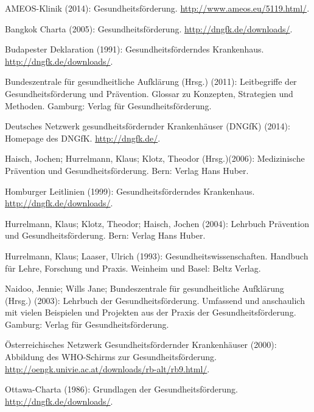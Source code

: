 \begin{thebibliography}{99}

	AMEOS-Klinik (2014): Gesundheitsförderung. \url{http://www.ameos.eu/5119.html/}.

	Bangkok Charta (2005): Gesundheitsförderung. \url{http://dngfk.de/downloads/}.
	
	Budapester Deklaration (1991): Gesundheitsförderndes Krankenhaus. \url{http://dngfk.de/downloads/}.
	
	Bundeszentrale für gesundheitliche Aufklärung (Hrsg.) (2011): Leitbegriffe der Gesundheitsförderung und Prävention. Glossar zu Konzepten, Strategien und Methoden. Gamburg: Verlag für Gesundheitsförderung.
	
	Deutsches Netzwerk gesundheitsfördernder Krankenhäuser (DNGfK) (2014): Homepage des DNGfK. \url{http://dngfk.de/}.
	
	Haisch, Jochen; Hurrelmann, Klaus; Klotz, Theodor (Hrsg.)(2006): Medizinische Prävention und Gesundheitsförderung. Bern: Verlag Hans Huber.
	
	Homburger Leitlinien (1999): Gesundheitsförderndes Krankenhaus. \url{http://dngfk.de/downloads/}.
	
	Hurrelmann, Klaus; Klotz, Theodor; Haisch, Jochen (2004): Lehrbuch Prävention und Gesundheitsförderung. Bern: Verlag Hans Huber.
	
	Hurrelmann, Klaus; Laaser, Ulrich (1993): Gesundheitswissenschaften. Handbuch für Lehre, Forschung und Praxis. Weinheim und Basel: Beltz Verlag.

	Naidoo, Jennie; Wills Jane; Bundeszentrale für gesundheitliche Aufklärung (Hrsg.) (2003): Lehrbuch der Gesundheitsförderung. Umfassend und anschaulich mit vielen Beispielen und Projekten aus der Praxis der Gesundheitsförderung. Gamburg: Verlag für Gesundheitsförderung.
	
	Österreichisches Netzwerk Gesundheitsfördernder Krankenhäuser (2000): Abbildung des WHO-Schirms zur Gesundheitsförderung. \url{http://oengk.univie.ac.at/downloads/rb-alt/rb9.html/}.
	
	Ottawa-Charta (1986): Grundlagen der Gesundheitsförderung. \url{http://dngfk.de/downloads/}.
	

\end{thebibliography}
